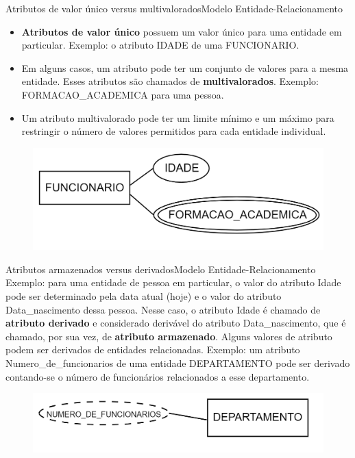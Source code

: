 \documentclass[t]{beamer}
\begin{document}
\begin{ftst}{Atributos de valor único versus multivalorados}{Modelo Entidade-Relacionamento}
\small
\begin{itemize}
    \item \textbf{Atributos de valor único} possuem um valor único para uma entidade em particular. Exemplo: o atributo IDADE de uma FUNCIONARIO.
    
    \item Em alguns casos, um atributo pode ter um conjunto de valores para a mesma entidade. Esses atributos são chamados de \textbf{multivalorados}. Exemplo: FORMACAO\_ACADEMICA para uma pessoa.
    
    \item Um atributo multivalorado pode ter um limite mínimo e um máximo para restringir o número de valores permitidos para cada entidade individual. 
\end{itemize}
\begin{figure}
    \centering
    \includegraphics[scale=0.2]{Figuras/01_6.png}
\end{figure}

\end{ftst}


\begin{ftst}{Atributos armazenados versus derivados}{Modelo Entidade-Relacionamento}
\small
Exemplo: para uma entidade de pessoa em particular, o valor do atributo Idade pode ser determinado pela data atual (hoje) e o valor do atributo Data\_nascimento dessa pessoa.
\vone
Nesse caso, o atributo Idade é chamado de \textbf{atributo derivado} e considerado derivável
do atributo Data\_nascimento, que é chamado, por sua vez, de \textbf{atributo armazenado}.
\vone
Alguns valores de atributo podem ser derivados de entidades relacionadas. Exemplo: um atributo Numero\_de\_funcionarios de uma entidade DEPARTAMENTO pode ser derivado contando-se o número de funcionários relacionados a esse departamento.

\begin{figure}
    \centering
    \includegraphics[scale=0.2]{Figuras/01_32.png}
\end{figure}

\end{ftst}
\end{document}
